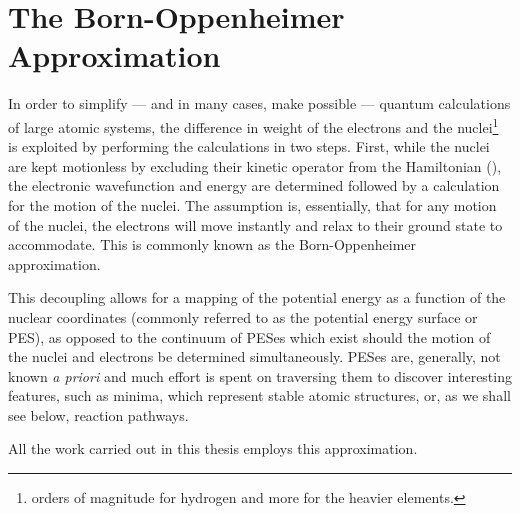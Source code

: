 \section{The Born-Oppenheimer Approximation}
\label{sec:born-oppenheimer}
In order to simplify --- and in many cases, make possible --- quantum calculations of large atomic systems, the difference in weight of the electrons and the nuclei\footnote{ orders of magnitude for hydrogen and more for the heavier elements.} is exploited by performing the calculations in two steps.
First, while the nuclei are kept motionless by excluding their kinetic operator from the Hamiltonian (), the electronic wavefunction and energy are determined followed by a calculation for the motion of the nuclei.
The assumption is, essentially, that for any motion of the nuclei, the electrons will move instantly and relax to their ground state to accommodate.
This is commonly known as the Born-Oppenheimer approximation.~\cite{born-oppenheimer-1927}


This decoupling allows for a mapping of the potential energy as a function of the nuclear coordinates (commonly referred to as the potential energy surface or PES), as opposed to the continuum of PESes which exist should the motion of the nuclei and electrons be determined simultaneously.
PESes are, generally, not known \textit{a priori} and much effort is spent on traversing them to discover interesting features, such as minima, which represent stable atomic structures, or, as we shall see below, reaction pathways.


All the work carried out in this thesis employs this approximation.

